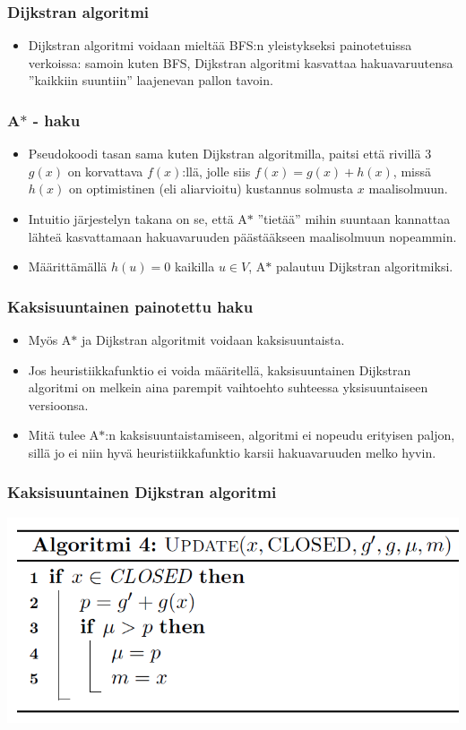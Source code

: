 \documentclass{beamer}
\begin{document}
\begin{frame}
  \frametitle{Dijkstran algoritmi}
  \begin{itemize}
    \item Dijkstran algoritmi voidaan mieltää BFS:n yleistykseksi painotetuissa verkoissa: samoin kuten BFS, Dijkstran algoritmi kasvattaa hakuavaruutensa ''kaikkiin suuntiin'' laajenevan pallon tavoin.
  \end{itemize}
\end{frame}

\begin{frame}
  \frametitle{A$\ast$ - haku}
  \begin{itemize}
    \item Pseudokoodi tasan sama kuten Dijkstran algoritmilla, paitsi että rivillä 3 $g(x)$ on korvattava $f(x)$:llä, jolle siis $f(x) = g(x) + h(x)$, missä $h(x)$ on optimistinen (eli aliarvioitu) kustannus solmusta $x$ maalisolmuun.
    
    \item Intuitio järjestelyn takana on se, että A$\ast$ ''tietää'' mihin suuntaan kannattaa lähteä kasvattamaan hakuavaruuden päästääkseen maalisolmuun nopeammin.
    
    \item Määrittämällä $h(u) = 0$ kaikilla $u \in V$, A$\ast$ palautuu Dijkstran algoritmiksi.
  \end{itemize}
\end{frame}

\begin{frame}
  \frametitle{Kaksisuuntainen painotettu haku}
  \begin{itemize}
    \item Myös A$\ast$ ja Dijkstran algoritmit voidaan kaksisuuntaista.
    \item Jos heuristiikkafunktio ei voida määritellä, kaksisuuntainen Dijkstran algoritmi on melkein aina parempit vaihtoehto suhteessa yksisuuntaiseen versioonsa.
    \item Mitä tulee A$\ast$:n kaksisuuntaistamiseen, algoritmi ei nopeudu erityisen paljon, sillä jo ei niin hyvä heuristiikkafunktio karsii hakuavaruuden melko hyvin.
  \end{itemize}
\end{frame}

\begin{frame}
  \frametitle{Kaksisuuntainen Dijkstran algoritmi}
  \includegraphics[width=\textwidth,height=\textheight,keepaspectratio]{update}
\end{frame}
\end{document}
